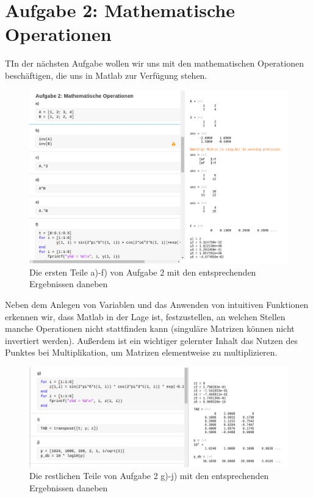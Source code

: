 \documentclass{article}
\begin{document}
\newpage

\section{Aufgabe 2: Mathematische Operationen}

\begin{task}
  TIn der nächsten Aufgabe wollen wir uns mit den mathematischen Operationen beschäftigen, die uns in Matlab zur Verfügung stehen.
\end{task}

\begin{figure}[h]
  \centering
  \includegraphics[width=\textwidth]{../assets/images/ET2P6/aufgaben2a_f.png}
  \caption{Die ersten Teile a)-f) von Aufgabe 2 mit den entsprechenden Ergebnissen daneben}
  \label{fig:auf2af}
\end{figure}

Neben dem Anlegen von Variablen und das Anwenden von intuitiven Funktionen erkennen wir, dass Matlab in der Lage ist, festzustellen, an welchen Stellen manche Operationen nicht stattfinden kann (singuläre Matrizen können nicht invertiert werden). Außerdem ist ein wichtiger gelernter Inhalt das Nutzen des Punktes bei Multiplikation, um Matrizen elementweise zu multiplizieren.

\begin{figure}[h]
  \centering
  \includegraphics[width=\textwidth]{../assets/images/ET2P6/aufgaben2g_j.png}
  \caption{Die restlichen Teile von Aufgabe 2 g)-j) mit den entsprechenden Ergebnissen daneben}
  \label{fig:auf2gj}
\end{figure}
\end{document}
